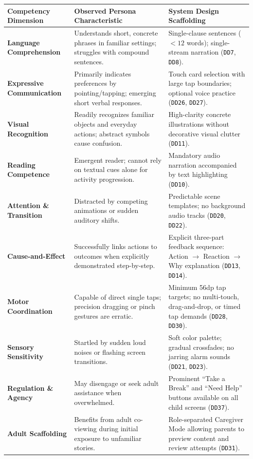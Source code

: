 \begin{xltabular}{\textwidth}{|p{4.0cm}|p{4.5cm}|X|}
\hline
\textbf{Competency Dimension} & \textbf{Observed Persona Characteristic} & \textbf{System Design Scaffolding} \\ \hline
\endhead
\textbf{Language Comprehension} & Understands short, concrete phrases in familiar settings; struggles with compound sentences. & Single-clause sentences ($<12$ words); single-stream narration (\texttt{DD7}, \texttt{DD8}). \\ \hline
\textbf{Expressive Communication} & Primarily indicates preferences by pointing/tapping; emerging short verbal responses. & Touch card selection with large tap boundaries; optional voice practice (\texttt{DD26}, \texttt{DD27}). \\ \hline
\textbf{Visual Recognition} & Readily recognizes familiar objects and everyday actions; abstract symbols cause confusion. & High-clarity concrete illustrations without decorative visual clutter (\texttt{DD11}). \\ \hline
\textbf{Reading Competence} & Emergent reader; cannot rely on textual cues alone for activity progression. & Mandatory audio narration accompanied by text highlighting (\texttt{DD10}). \\ \hline
\textbf{Attention \& Transition} & Distracted by competing animations or sudden auditory shifts. & Predictable scene templates; no background audio tracks (\texttt{DD20}, \texttt{DD22}). \\ \hline
\textbf{Cause-and-Effect} & Successfully links actions to outcomes when explicitly demonstrated step-by-step. & Explicit three-part feedback sequence: Action $\rightarrow$ Reaction $\rightarrow$ Why explanation (\texttt{DD13}, \texttt{DD14}). \\ \hline
\textbf{Motor Coordination} & Capable of direct single taps; precision dragging or pinch gestures are erratic. & Minimum 56dp tap targets; no multi-touch, drag-and-drop, or timed tap demands (\texttt{DD28}, \texttt{DD30}). \\ \hline
\textbf{Sensory Sensitivity} & Startled by sudden loud noises or flashing screen transitions. & Soft color palette; gradual crossfades; no jarring alarm sounds (\texttt{DD21}, \texttt{DD23}). \\ \hline
\textbf{Regulation \& Agency} & May disengage or seek adult assistance when overwhelmed. & Prominent ``Take a Break'' and ``Need Help'' buttons available on all child screens (\texttt{DD37}). \\ \hline
\textbf{Adult Scaffolding} & Benefits from adult co-viewing during initial exposure to unfamiliar stories. & Role-separated Caregiver Mode allowing parents to preview content and review attempts (\texttt{DD31}). \\ \hline
\end{xltabular}
\label{tab:c2_persona_minh}

